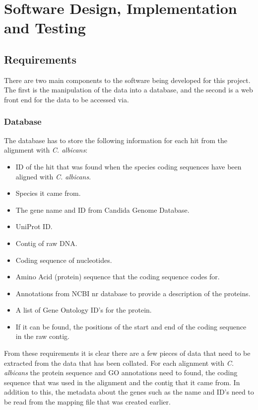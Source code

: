 \chapter{Software Design, Implementation and Testing}

\section{Requirements}
There are two main components to the software being developed for this project. The first is the manipulation of the data into a database, and the second is a web front end for the data to be accessed via. 

\subsection{Database}
The database has to store the following information for each hit from the alignment with \textit{C. albicans}:

\begin{itemize}
  \item ID of the hit that was found when the species coding sequences have been aligned with \textit{C. albicans}.
  \item Species it came from.
  \item The gene name and ID from Candida Genome Database.
  \item UniProt ID.
  \item Contig of raw DNA.
  \item Coding sequence of nucleotides.
  \item Amino Acid (protein) sequence that the coding sequence codes for.
  \item Annotations from NCBI nr database to provide a description of the proteins.
  \item A list of Gene Ontology\cite{geneontology} ID's for the protein.
  \item If it can be found, the positions of the start and end of the coding sequence in the raw contig. 
\end{itemize}

From these requirements it is clear there are a few pieces of data that need to be extracted from the data that has been collated. For each alignment with \textit{C. albicans} the protein sequence and GO annotations need to found, the coding sequence that was used in the alignment and the contig that it came from. In addition to this, the metadata about the genes such as the name and ID's need to be read from the mapping file that was created earlier. 

